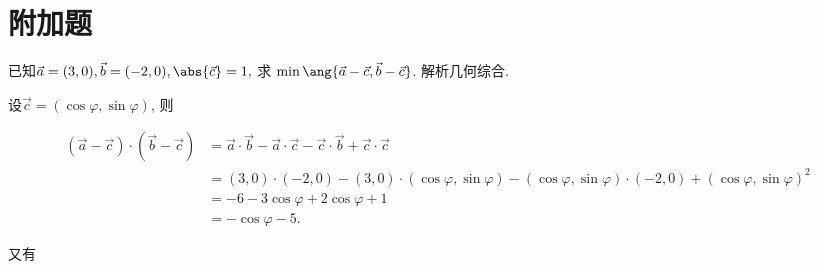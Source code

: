 \documentclass[8pt]{article}
\begin{document}
	\section{附加题}
		\begin{easonbigproblem}
			已知\(\vec{a} = (3, 0), \vec{b} = (-2, 0), \abs{\vec{c}} = 1,\) 求 \(\min \ang{\vec{a} - \vec{c}, \vec{b} - \vec{c}}\).
			\subbigproblem
			 解析几何综合.

			设\(\vec{c} = (\cos \varphi, \sin \varphi)\), 则

			\begin{align}
				\left(\vec{a} - \vec{c}\right) \cdot \left(\vec{b} - \vec{c}\right) &= \vec{a} \cdot \vec{b} - \vec{a} \cdot \vec{c} - \vec{c} \cdot \vec{b} + \vec{c} \cdot \vec{c}\\
				&= (3, 0) \cdot (-2, 0) - (3, 0) \cdot (\cos \varphi, \sin \varphi) - (\cos \varphi, \sin \varphi) \cdot (-2, 0) + (\cos \varphi, \sin \varphi)^2\\
				&= -6 - 3 \cos \varphi + 2 \cos \varphi + 1\\
				&= -\cos \varphi - 5.
			\end{align}

			又有


\end{easonbigproblem}
\end{document}
